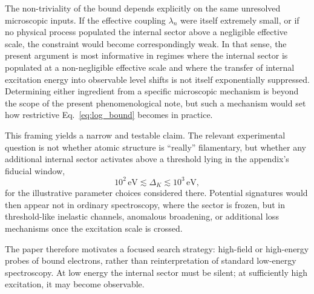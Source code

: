 \documentclass[pdflatex,sn-mathphys-num]{sn-jnl}
\begin{document}
        The non-triviality of the bound depends explicitly on the same unresolved microscopic inputs. If the effective coupling $\lambda_n$ were itself extremely small, or if no physical process populated the internal sector above a negligible effective scale, the constraint would become correspondingly weak. In that sense, the present argument is most informative in regimes where the internal sector is populated at a non-negligible effective scale and where the transfer of internal excitation energy into observable level shifts is not itself exponentially suppressed. Determining either ingredient from a specific microscopic mechanism is beyond the scope of the present phenomenological note, but such a mechanism would set how restrictive Eq.~\eqref{eq:log_bound} becomes in practice.

        This framing yields a narrow and testable claim. The relevant experimental question is not whether atomic structure is ``really'' filamentary, but whether any additional internal sector activates above a threshold lying in the appendix's fiducial window,
        \begin{equation}
            10^2\,\mathrm{eV} \lesssim \Delta_K \lesssim 10^3\,\mathrm{eV},
        \end{equation}
        for the illustrative parameter choices considered there. Potential signatures would then appear not in ordinary spectroscopy, where the sector is frozen, but in threshold-like inelastic channels, anomalous broadening, or additional loss mechanisms once the excitation scale is crossed.

        The paper therefore motivates a focused search strategy: high-field or high-energy probes of bound electrons, rather than reinterpretation of standard low-energy spectroscopy. At low energy the internal sector must be silent; at sufficiently high excitation, it may become observable.

        \appendix
\end{document}
